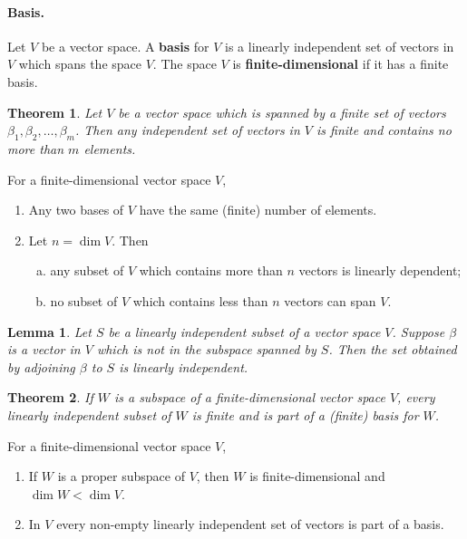 \documentclass{article}
\newtheorem{theorem}{Theorem}[section]
\newtheorem*{lemma*}{Lemma}
\begin{document}
\paragraph{Basis.} Let $V$ be a vector space. A \textbf{basis} for $V$ is a
linearly independent set of vectors in $V$ which spans the space $V$. The space
$V$ is \textbf{finite-dimensional} if it has a finite basis.

\begin{theorem}
  Let $V$ be a vector space which is spanned by a finite set of vectors
  $\beta_1, \beta_2, \ldots, \beta_m$. Then any independent set of vectors in
  $V$ is finite and contains no more than $m$ elements.
\end{theorem}

For a finite-dimensional vector space $V$,
\begin{enumerate}
  \item Any two bases of $V$ have the same (finite) number of elements.
  \item Let $n = \dim V$. Then
    \begin{enumerate}[(a)]
      \item any subset of $V$ which contains more than $n$ vectors is linearly
        dependent;
      \item no subset of $V$ which contains less than $n$ vectors can span $V$.
    \end{enumerate}
\end{enumerate}

\begin{lemma*}
  Let $S$ be a linearly independent subset of a vector space $V$. Suppose
  $\beta$ is a vector in $V$ which is not in the subspace spanned by $S$. Then
  the set obtained by adjoining $\beta$ to $S$ is linearly independent.
\end{lemma*}

\begin{theorem}
  If $W$ is a subspace of a finite-dimensional vector space $V$, every linearly
  independent subset of $W$ is finite and is part of a (finite) basis for $W$.
\end{theorem}

For a finite-dimensional vector space $V$,
\begin{enumerate}
  \item If $W$ is a proper subspace of $V$, then $W$ is finite-dimensional and
    $\dim W < \dim V$.
  \item In $V$ every non-empty linearly independent set of vectors is part of a
    basis.
\end{enumerate}
\end{document}
